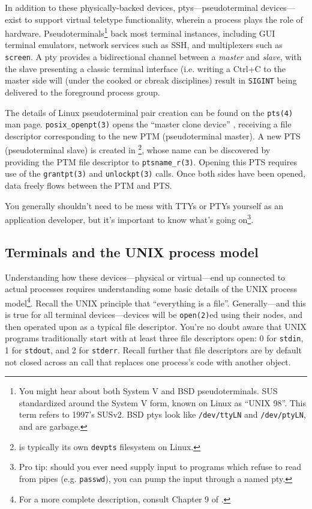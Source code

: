 In addition to these physically-backed devices, ptys---pseudoterminal devices\cite{pty7}---exist
to support virtual teletype functionality, wherein a process plays the role
of hardware. Pseudoterminals\footnote{You might
 hear about both System V and BSD pseudoterminals. SUS standardized around
the System V form, known on Linux as ``UNIX 98''. This term refers to 1997's
SUSv2. BSD ptys look like \texttt{/dev/ttyLN} and \texttt{/dev/ptyLN}, and are
garbage.} back most terminal instances, including GUI terminal emulators, network
services such as SSH, and multiplexers such as \texttt{screen}. A pty provides a
bidirectional channel between a \textit{master} and \textit{slave}, with the
slave presenting a classic terminal interface (i.e. writing a Ctrl+C to the
master side will (under the cooked or cbreak disciplines) result in
\texttt{SIGINT} being delivered to the foreground process group.

The details of Linux pseudoterminal pair creation can be found on the \texttt{pts(4)}\cite{pts4} man page.
\texttt{posix\_openpt(3)}\cite{posixopenpt3} opens the ``master clone device''
, receiving a file descriptor corresponding to the new PTM (pseudoterminal master).
A new PTS (pseudoterminal slave) is created in 
\footnote{ is typically its own \texttt{devpts} filesystem on Linux.}, whose name can be discovered by
providing the PTM file descriptor to \texttt{ptsname\_r(3)}\cite{ptsname3}.
Opening this PTS requires use of the \texttt{grantpt(3)} and \texttt{unlockpt(3)} calls.
Once both sides have been opened, data freely flows between the PTM and PTS.

You generally shouldn't need to be mess with TTYs or PTYs yourself as an
application developer, but it's important to know what's going on\footnote{Pro
tip: should you ever need supply input to programs which refuse to read from
pipes (e.g. \texttt{passwd}), you can pump the input through a named pty.}.

\subsection{Terminals and the UNIX process model}
\label{sec:unixprocs}

Understanding how these devices---physical or virtual---end up connected to
actual processes requires understanding some basic details of the UNIX
process model\footnote{For a more complete description, consult Chapter 9
of \cite{apiue}.}. Recall the UNIX principle that ``everything is a file''. Generally---and
this is true for all terminal devices---devices will be \texttt{open(2)}ed
using their  nodes, and then operated upon as a typical file
descriptor. You're no doubt aware that UNIX programs traditionally start with
at least three file descriptors open: 0 for \texttt{stdin}, 1 for
\texttt{stdout}, and 2 for \texttt{stderr}. Recall further that file descriptors
are by default not closed across an  call that replaces one
process's code with another object.

